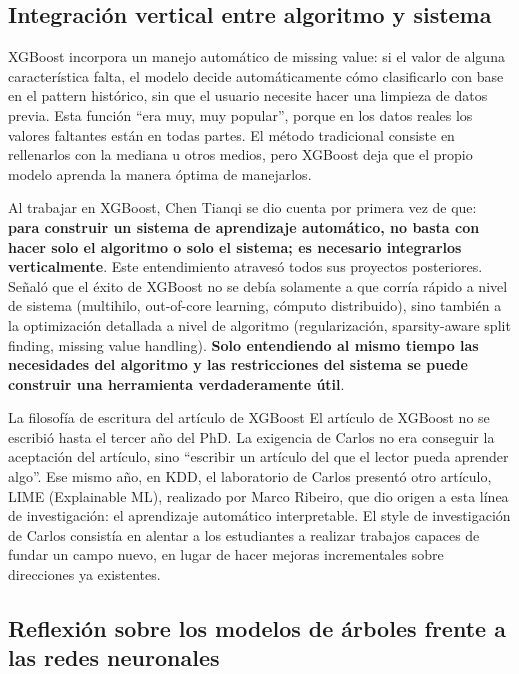 \subsection{Integración vertical entre algoritmo y sistema}

XGBoost incorpora un manejo automático de missing value: si el valor de alguna característica falta, el modelo decide automáticamente cómo clasificarlo con base en el pattern histórico, sin que el usuario necesite hacer una limpieza de datos previa. Esta función ``era muy, muy popular'', porque en los datos reales los valores faltantes están en todas partes. El método tradicional consiste en rellenarlos con la mediana u otros medios, pero XGBoost deja que el propio modelo aprenda la manera óptima de manejarlos.

Al trabajar en XGBoost, Chen Tianqi se dio cuenta por primera vez de que: \textbf{para construir un sistema de aprendizaje automático, no basta con hacer solo el algoritmo o solo el sistema; es necesario integrarlos verticalmente}. Este entendimiento atravesó todos sus proyectos posteriores. Señaló que el éxito de XGBoost no se debía solamente a que corría rápido a nivel de sistema (multihilo, out-of-core learning, cómputo distribuido), sino también a la optimización detallada a nivel de algoritmo (regularización, sparsity-aware split finding, missing value handling). \textbf{Solo entendiendo al mismo tiempo las necesidades del algoritmo y las restricciones del sistema se puede construir una herramienta verdaderamente útil}.

\begin{knowledgebox}{La filosofía de escritura del artículo de XGBoost}
El artículo de XGBoost no se escribió hasta el tercer año del PhD. La exigencia de Carlos no era conseguir la aceptación del artículo, sino ``escribir un artículo del que el lector pueda aprender algo''. Ese mismo año, en KDD, el laboratorio de Carlos presentó otro artículo, LIME (Explainable ML), realizado por Marco Ribeiro, que dio origen a esta línea de investigación: el aprendizaje automático interpretable. El style de investigación de Carlos consistía en alentar a los estudiantes a realizar trabajos capaces de fundar un campo nuevo, en lugar de hacer mejoras incrementales sobre direcciones ya existentes.
\end{knowledgebox}

\subsection{Reflexión sobre los modelos de árboles frente a las redes neuronales}

